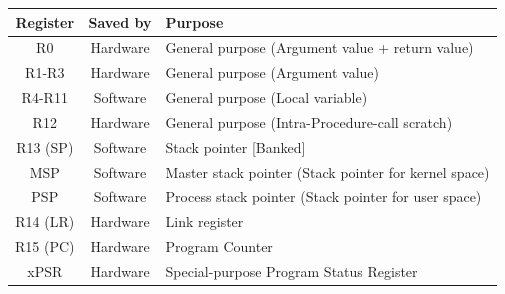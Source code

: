 \begin{table}[H]
	\centering
	\begin{tabular}{|c|c|p{9.5cm}|}
		\hline
		Register	&	Saved by	&	Purpose\\
		\hline
		R0			&	Hardware	&	General purpose (Argument value + return value)\\
		\hline
		R1-R3		&	Hardware	&	General purpose (Argument value)\\
		\hline
		R4-R11		&	Software	&	General purpose (Local variable)\\
		\hline
		R12			&	Hardware	&	General purpose (Intra-Procedure-call scratch)\\
		\hline
		R13 (SP)	&	Software	&	Stack pointer [Banked]\\
		MSP			&	Software	&	Master stack pointer (Stack pointer for kernel space)\\
		PSP			&	Software	&	Process stack pointer (Stack pointer for user space)\\
		\hline
		R14 (LR)	&	Hardware	&	Link register\\
		\hline
		R15 (PC)	&	Hardware	&	Program Counter\\
		\hline
		xPSR		&	Hardware	& 	Special-purpose Program Status Register\\
		\hline
	\end{tabular}
	\label{tab:registers}
\end{table}

